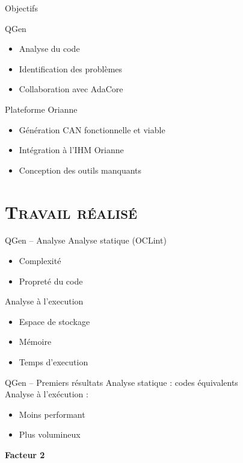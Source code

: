 \documentclass[xcolor=x11names,compress]{beamer}
\begin{document}
\begin{frame}{Objectifs}
  \begin{block}{QGen}{}
	\begin{itemize}
	  \item Analyse du code
	  \item Identification des problèmes
	  \item Collaboration avec AdaCore
	\end{itemize}
  \end{block}
  \begin{block}{Plateforme Orianne}{}
	\begin{itemize}
	  \item Génération CAN fonctionnelle et viable
	  \item Intégration à l'IHM Orianne
	  \item Conception des outils manquants
	\end{itemize}
  \end{block}
\end{frame}

\section{\scshape Travail réalisé}
\begin{frame}{QGen -- Analyse}
  \vfill
  Analyse statique (OCLint)
  \begin{itemize}
	\item Complexité
	\item Propreté du code
  \end{itemize}
  \vfill
  Analyse à l'execution
  \begin{itemize}
	\item Espace de stockage
	\item Mémoire
	\item Temps d'execution
  \end{itemize}
  \vfill
\end{frame}

\begin{frame}{QGen -- Premiers résultats}
  \vfill
  Analyse statique : codes équivalents\\
  \vfill
  Analyse à l'exécution :
  \begin{itemize}
	\item Moins performant
	\item Plus volumineux
  \end{itemize}
  \vfill
  \centering
  {\bf Facteur 2}
  \vfill
\end{frame}
\end{document}
